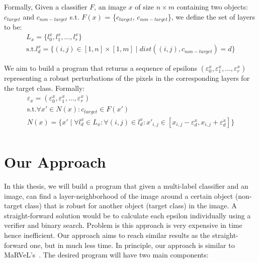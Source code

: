 \documentclass[11pt]{article}
\begin{document}
Formally, Given a classifier $F$, an image $x$ of size $n\times m$ containing two objects: $c_{target}$ and $c_{non-target}$ \textrm{s.t.} $F(x)$ = \{$c_{target}$, $c_{non-target}$\},
we define the set of layers to be:
\begin{gather*}
     L_x = \{l_0^x, l_1^x, \ldots, l_r^x\}\\
    \textrm{s.t.}  l_d^x = \{(i,j) \in [1,n]\times [1,m] \mid dist((i, j), c_{non-target}) = d\}
\end{gather*}

We aim to build a program that returns a sequence of epsilons $(\varepsilon_0^x, \varepsilon_1^x, \ldots, \varepsilon_r^x)$ representing a robust perturbations of the pixels in the corresponding layers for the target class.
Formally:
\begin{gather*}
     \varepsilon_x = (\varepsilon_0^x, \varepsilon_1^x, \ldots, \varepsilon_r^x)\\
    \textrm{s.t.}  \forall x' \in N(x): c_{target} \in F(x')\\
    N(x) = \{x' \mid \forall l_d^x\in L_x: \forall (i,j)\in l_d^x: x'_{i,j} \in [x_{i,j}-\varepsilon_d^x, x_{i,j}+\varepsilon_d^x]\}\\
\end{gather*}

\section{Our Approach}

In this thesis, we will build a program that given a multi-label classifier and an image, can find a layer-neighborhood of the image around a certain object (non-target class) that is robust for another object (target class) in the image.
A straight-forward solution would be to calculate each epsilon individually using a verifier and binary search.
Problem is this approach is very expensive in time hence inefficient.
Our approach aims to reach similar results as the straight-forward one, but in much less time.
In principle, our approach is similar to MaRVeL's~\cite{MARVEL}.
The desired program will have two main components:
\end{document}
